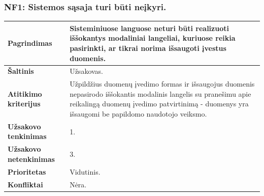 \documentclass[12pt]{article}
\begin{document}
\subsubsection*{NF1: Sistemos sąsaja turi būti neįkyri.}
\label{sec:NF1}
\begin{table}[htb!]
    \captionsetup{justification=centering}
    \begin{tabular}{|m{4.9cm}|m{11cm}|}
        \hline
        \raggedleft \textbf{\cellcolor{deepchampagne}Pagrindimas} &
        Sisteminiuose languose neturi būti realizuoti iššokantys modaliniai
        langeliai, kuriuose reikia pasirinkti, ar tikrai norima išsaugoti
        įvestus duomenis. \\
        \hline
        \raggedleft \textbf{\cellcolor{deepchampagne}Šaltinis} & Užsakovas. \\
        \hline
        \raggedleft \textbf{\cellcolor{deepchampagne}Atitikimo kriterijus} & 
        Užpildžius duomenų įvedimo formas ir išsaugojus duomenis nepasirodo
        iššokantis modalinis langelis su pranešimu apie reikalingą duomenų
        įvedimo patvirtinimą - duomenys yra išsaugomi be papildomo naudotojo
        veiksmo. \\
        \hline
        \raggedleft \textbf{\cellcolor{deepchampagne}Užsakovo tenkinimas} & 1. \\
        \hline
        \raggedleft \textbf{\cellcolor{deepchampagne}Užsakovo netenkinimas} & 3. \\
        \hline
        \raggedleft \textbf{\cellcolor{deepchampagne}Prioritetas} & Vidutinis. \\
        \hline
        \raggedleft \textbf{\cellcolor{deepchampagne}Konfliktai} & Nėra. \\
        \hline
    \end{tabular}
\end{table}
\end{document}
